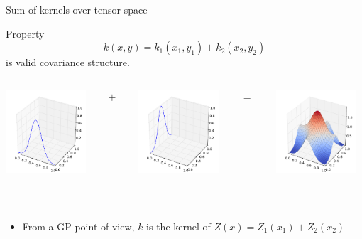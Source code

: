 \documentclass{beamer}
\begin{document}
\begin{frame}{Sum of kernels over tensor space}
\begin{block}{Property}
\begin{equation}
k(x,y) = k_1(x_1,y_1) +  k_2(x_2,y_2)
\end{equation} is valid covariance structure.\\
\begin{columns}[c]
\begin{column}{3cm}
\includegraphics[width=3cm]{figures/python/newfromold-sum2-k1}
\end{column}
\begin{column}{2mm}
$+$
\end{column}
\begin{column}{3cm}
\includegraphics[width=3cm]{figures/python/newfromold-sum2-k2}
\end{column}
\begin{column}{2mm}
$=$
\end{column}
\begin{column}{3cm}
\includegraphics[width=3cm]{figures/python/newfromold-sum2-k12}
\end{column}
\end{columns}
\vspace{4mm}
\end{block} \ \\
\begin{itemize}
 \item From a GP point of view, $k$ is the kernel of $Z(x) = Z_1(x_1) + Z_2(x_2)$
\end{itemize}
\end{frame}
\end{document}
